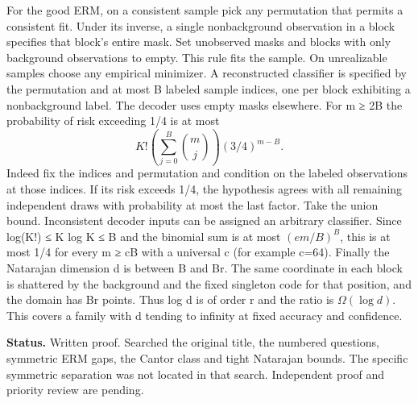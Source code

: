 \documentclass[11pt]{article}
\begin{document}
For the good ERM, on a consistent sample pick any permutation that permits a consistent fit. Under its inverse, a single nonbackground observation in a block specifies that block's entire mask. Set unobserved masks and blocks with only background observations to empty. This rule fits the sample. On unrealizable samples choose any empirical minimizer. A reconstructed classifier is specified by the permutation and at most B labeled sample indices, one per block exhibiting a nonbackground label. The decoder uses empty masks elsewhere. For m ≥ 2B the probability of risk exceeding 1/4 is at most
\[ K!\left(\sum_{j=0}^{B}{m\choose j}\right)(3/4)^{m-B}.\]
Indeed fix the indices and permutation and condition on the labeled observations at those indices. If its risk exceeds 1/4, the hypothesis agrees with all remaining independent draws with probability at most the last factor. Take the union bound. Inconsistent decoder inputs can be assigned an arbitrary classifier. Since log(K!) ≤ K log K ≤ B and the binomial sum is at most \((em/B)^B\), this is at most 1/4 for every m ≥ cB with a universal c (for example c=64). Finally the Natarajan dimension d is between B and Br. The same coordinate in each block is shattered by the background and the fixed singleton code for that position, and the domain has Br points. Thus log d is of order r and the ratio is \(\Omega(\log d)\). This covers a family with d tending to infinity at fixed accuracy and confidence.

\textbf{Status.} Written proof. Searched the original title, the numbered questions, symmetric ERM gaps, the Cantor class and tight Natarajan bounds. The specific symmetric separation was not located in that search. Independent proof and priority review are pending.
\end{document}
